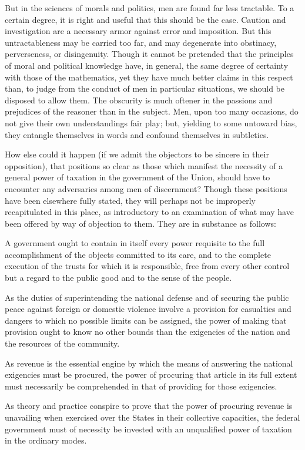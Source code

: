 But in the sciences of morals and politics, men are found far less tractable. 
To a certain degree, it is right and useful that this should be the case. 
Caution and investigation are a necessary armor against error and imposition. 
But this untractableness may be carried too far, and may degenerate into obstinacy, perverseness, or disingenuity. 
Though it cannot be pretended that the principles of moral and political knowledge have, in general, the same degree of certainty with those of the mathematics, yet they have much better claims in this respect than, to judge from the conduct of men in particular situations, we should be disposed to allow them. 
The obscurity is much oftener in the passions and prejudices of the reasoner than in the subject. 
Men, upon too many occasions, do not give their own understandings fair play; but, yielding to some untoward bias, they entangle themselves in words and confound themselves in subtleties.

How else could it happen (if we admit the objectors to be sincere in their opposition), that positions so clear as those which manifest the necessity of a general power of taxation in the government of the Union, should have to encounter any adversaries among men of discernment? 
Though these positions have been elsewhere fully stated, they will perhaps not be improperly recapitulated in this place, as introductory to an examination of what may have been offered by way of objection to them. 
They are in substance as follows:

A government ought to contain in itself every power requisite to the full accomplishment of the objects committed to its care, and to the complete execution of the trusts for which it is responsible, free from every other control but a regard to the public good and to the sense of the people.

As the duties of superintending the national defense and of securing the public peace against foreign or domestic violence involve a provision for casualties and dangers to which no possible limits can be assigned, the power of making that provision ought to know no other bounds than the exigencies of the nation and the resources of the community.

As revenue is the essential engine by which the means of answering the national exigencies must be procured, the power of procuring that article in its full extent must necessarily be comprehended in that of providing for those exigencies.

As theory and practice conspire to prove that the power of procuring revenue is unavailing when exercised over the States in their collective capacities, the federal government must of necessity be invested with an unqualified power of taxation in the ordinary modes.

